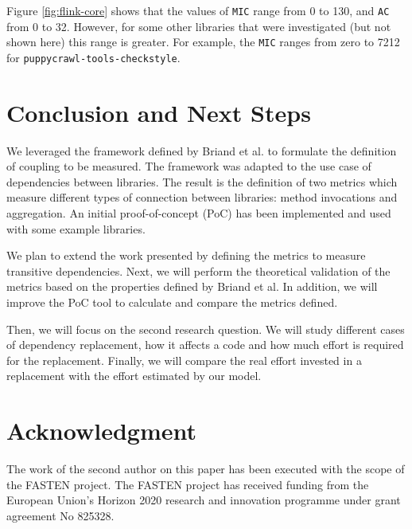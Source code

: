 \documentclass[a4paper]{article}
\begin{document}
Figure \ref{fig:flink-core} shows that the values of \texttt{MIC} range from 0 to 130, and \texttt{AC} from 0 to 32. However, for some other libraries that were investigated (but not shown here) this range is greater. For example, the \texttt{MIC} ranges from zero to 7212 for \texttt{puppycrawl-tools-checkstyle}.

\section{Conclusion and Next Steps}
We leveraged the framework defined by Briand et al. to formulate the definition of coupling to be measured. The framework was adapted to the use case of dependencies between libraries. The result is the definition of two metrics which measure different types of connection between libraries: method invocations and aggregation. An initial proof-of-concept (PoC) has been implemented and used with some example libraries.

We plan to extend the work presented by defining the metrics to measure transitive dependencies. Next, we will perform the theoretical validation of the metrics based on the properties defined by Briand et al. In addition, we will improve the PoC tool to calculate and compare the metrics defined.


Then, we will focus on the second research question. We will study different cases of dependency replacement, how it affects a code and how much effort is required for the replacement.
Finally, we will %
compare the real effort invested in a replacement with the effort estimated by our model.

\section{Acknowledgment}
The work of the second author on this paper has been executed with the scope of the FASTEN project. The FASTEN project has received funding from the European Union's Horizon 2020 research and innovation programme under grant agreement No 825328.



\end{document}
